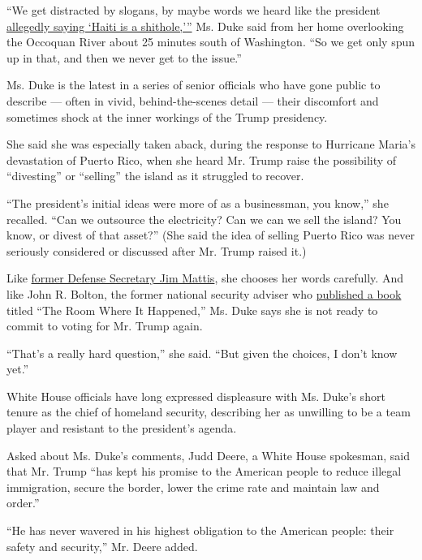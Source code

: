 ``We get distracted by slogans, by maybe words we heard like the
president
\href{https://www.nytimes.com/2018/01/11/us/politics/trump-shithole-countries.html}{allegedly
saying `Haiti is a shithole,'''} Ms. Duke said from her home overlooking
the Occoquan River about 25 minutes south of Washington. ``So we get
only spun up in that, and then we never get to the issue.''

Ms. Duke is the latest in a series of senior officials who have gone
public to describe --- often in vivid, behind-the-scenes detail ---
their discomfort and sometimes shock at the inner workings of the Trump
presidency.

She said she was especially taken aback, during the response to
Hurricane Maria's devastation of Puerto Rico, when she heard Mr. Trump
raise the possibility of ``divesting'' or ``selling'' the island as it
struggled to recover.

``The president's initial ideas were more of as a businessman, you
know,'' she recalled. ``Can we outsource the electricity? Can we can we
sell the island? You know, or divest of that asset?'' (She said the idea
of selling Puerto Rico was never seriously considered or discussed after
Mr. Trump raised it.)

Like
\href{https://www.theatlantic.com/politics/archive/2020/06/james-mattis-denounces-trump-protests-militarization/612640/}{former
Defense Secretary Jim Mattis}, she chooses her words carefully. And like
John R. Bolton, the former national security adviser who
\href{https://www.nytimes.com/2020/06/23/us/politics/john-bolton-interview-trump.html}{published
a book} titled ``The Room Where It Happened,'' Ms. Duke says she is not
ready to commit to voting for Mr. Trump again.

``That's a really hard question,'' she said. ``But given the choices, I
don't know yet.''

White House officials have long expressed displeasure with Ms. Duke's
short tenure as the chief of homeland security, describing her as
unwilling to be a team player and resistant to the president's agenda.

Asked about Ms. Duke's comments, Judd Deere, a White House spokesman,
said that Mr. Trump ``has kept his promise to the American people to
reduce illegal immigration, secure the border, lower the crime rate and
maintain law and order.''

``He has never wavered in his highest obligation to the American people:
their safety and security,'' Mr. Deere added.

